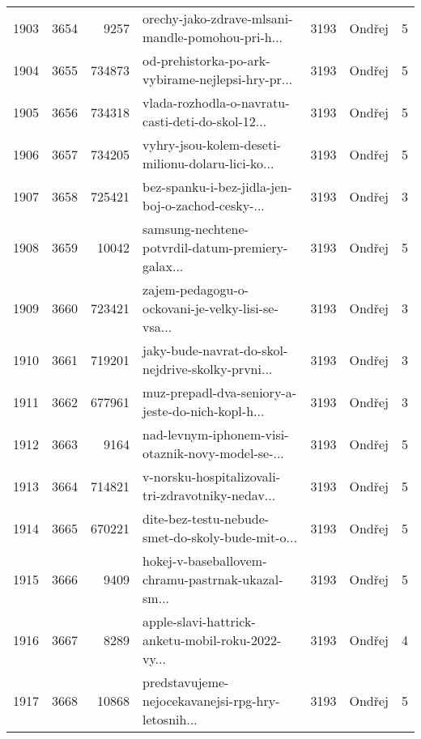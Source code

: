 \begin{tabular}{lrrlrlr}
1903 &       3654 &     9257 &  orechy-jako-zdrave-mlsani-mandle-pomohou-pri-h... &     3193 &                       Ondřej &               5 \\
1904 &       3655 &   734873 &  od-prehistorka-po-ark-vybirame-nejlepsi-hry-pr... &     3193 &                       Ondřej &               5 \\
1905 &       3656 &   734318 &  vlada-rozhodla-o-navratu-casti-deti-do-skol-12... &     3193 &                       Ondřej &               5 \\
1906 &       3657 &   734205 &  vyhry-jsou-kolem-deseti-milionu-dolaru-lici-ko... &     3193 &                       Ondřej &               5 \\
1907 &       3658 &   725421 &  bez-spanku-i-bez-jidla-jen-boj-o-zachod-cesky-... &     3193 &                       Ondřej &               3 \\
1908 &       3659 &    10042 &  samsung-nechtene-potvrdil-datum-premiery-galax... &     3193 &                       Ondřej &               5 \\
1909 &       3660 &   723421 &  zajem-pedagogu-o-ockovani-je-velky-lisi-se-vsa... &     3193 &                       Ondřej &               3 \\
1910 &       3661 &   719201 &  jaky-bude-navrat-do-skol-nejdrive-skolky-prvni... &     3193 &                       Ondřej &               3 \\
1911 &       3662 &   677961 &  muz-prepadl-dva-seniory-a-jeste-do-nich-kopl-h... &     3193 &                       Ondřej &               3 \\
1912 &       3663 &     9164 &  nad-levnym-iphonem-visi-otaznik-novy-model-se-... &     3193 &                       Ondřej &               5 \\
1913 &       3664 &   714821 &  v-norsku-hospitalizovali-tri-zdravotniky-nedav... &     3193 &                       Ondřej &               5 \\
1914 &       3665 &   670221 &  dite-bez-testu-nebude-smet-do-skoly-bude-mit-o... &     3193 &                       Ondřej &               5 \\
1915 &       3666 &     9409 &  hokej-v-baseballovem-chramu-pastrnak-ukazal-sm... &     3193 &                       Ondřej &               5 \\
1916 &       3667 &     8289 &  apple-slavi-hattrick-anketu-mobil-roku-2022-vy... &     3193 &                       Ondřej &               4 \\
1917 &       3668 &    10868 &  predstavujeme-nejocekavanejsi-rpg-hry-letosnih... &     3193 &                       Ondřej &               5 \\

\end{tabular}
